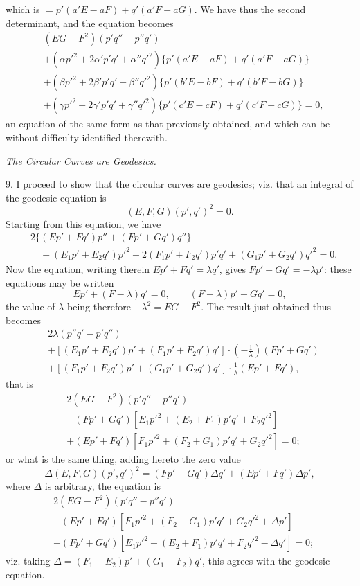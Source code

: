 \documentclass[11pt,a4paper]{article}
\newcommand{\qform}[2]{(#1)(#2)^2}
\begin{document}
which is \(=p'(a'E-aF)+q'(a'F-aG)\). We have thus the second determinant, and
the equation becomes
\[
\begin{aligned}
&(EG-F^2)(p'q''-p''q')\\
&+(\alpha p'^2+2\alpha'p'q'+\alpha''q'^2)
  \{p'(a'E-aF)+q'(a'F-aG)\}\\
&+(\beta p'^2+2\beta'p'q'+\beta''q'^2)
  \{p'(b'E-bF)+q'(b'F-bG)\}\\
&+(\gamma p'^2+2\gamma'p'q'+\gamma''q'^2)
  \{p'(c'E-cF)+q'(c'F-cG)\}=0,
\end{aligned}
\]
an equation of the same form as that previously obtained, and which can be without
difficulty identified therewith.

\begin{center}\itshape The Circular Curves are Geodesics.\end{center}

9. I proceed to show that the circular curves are geodesics; viz. that an integral of
the geodesic equation is
\[
\qform{E,F,G}{p',q'}=0.
\]
Starting from this equation, we have
\[
\begin{aligned}
&2\{(Ep'+Fq')p''+(Fp'+Gq')q''\}\\
&\quad +(E_1p'+E_2q')p'^2
 +2(F_1p'+F_2q')p'q'
 +(G_1p'+G_2q')q'^2=0.
\end{aligned}
\]
Now the equation, writing therein \(Ep'+Fq'=\lambda q'\), gives
\(Fp'+Gq'=-\lambda p'\): these equations may be written
\[
Ep'+(F-\lambda)q'=0,\qquad
(F+\lambda)p'+Gq'=0,
\]
the value of \(\lambda\) being therefore \(-\lambda^2=EG-F^2\). The result just
obtained thus becomes
\[
\begin{aligned}
&2\lambda(p''q'-p'q'')\\
&+[(E_1p'+E_2q')p'+(F_1p'+F_2q')q']\cdot
  \left(-\frac1\lambda\right)(Fp'+Gq')\\
&+[(F_1p'+F_2q')p'+(G_1p'+G_2q')q']\cdot
  \frac1\lambda(Ep'+Fq'),
\end{aligned}
\]
that is
\[
\begin{aligned}
&2(EG-F^2)(p'q''-p''q')\\
&-(Fp'+Gq')[E_1p'^2+(E_2+F_1)p'q'+F_2q'^2]\\
&+(Ep'+Fq')[F_1p'^2+(F_2+G_1)p'q'+G_2q'^2]=0;
\end{aligned}
\]
or what is the same thing, adding hereto the zero value
\[
\Delta\qform{E,F,G}{p',q'}=(Fp'+Gq')\Delta q'+(Ep'+Fq')\Delta p',
\]
where \(\Delta\) is arbitrary, the equation is
\[
\begin{aligned}
&2(EG-F^2)(p'q''-p''q')\\
&+(Ep'+Fq')[F_1p'^2+(F_2+G_1)p'q'+G_2q'^2+\Delta p']\\
&-(Fp'+Gq')[E_1p'^2+(E_2+F_1)p'q'+F_2q'^2-\Delta q']=0;
\end{aligned}
\]
viz. taking \(\Delta=(F_1-E_2)p'+(G_1-F_2)q'\), this agrees with the geodesic
equation.
\end{document}
